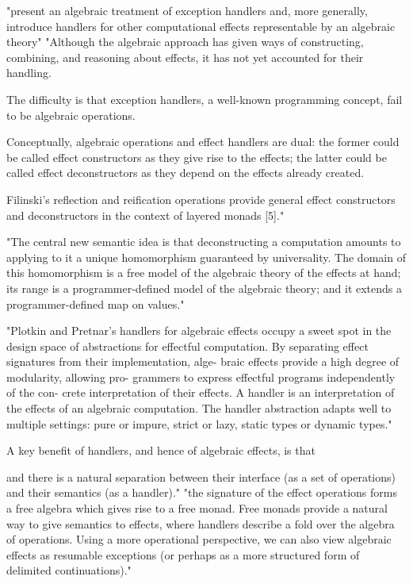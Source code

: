"present an algebraic treatment of exception handlers and,
more generally, introduce handlers for other computational effects
representable by an algebraic theory"
"Although the algebraic approach has given ways of constructing,
combining, and reasoning about effects, it has not yet accounted for their handling.


The difficulty is that exception handlers, a well-known programming concept,
fail to be algebraic operations.

Conceptually, algebraic operations and effect handlers are dual:
the former could be called effect constructors as they give rise to the effects;
the latter could be called effect deconstructors as they depend on the effects already created.

Filinski’s reflection and reification operations provide general effect constructors
and deconstructors in the context of layered monads [5]."

"The central new semantic idea is that deconstructing a computation amounts to
applying to it a unique homomorphism guaranteed by universality.
The domain of this homomorphism is a free model of the algebraic theory of the effects at hand;
its range is a programmer-defined model of the algebraic theory;
and it extends a programmer-defined map on values."
\cite{Plotkin:2009dr}


"Plotkin and Pretnar’s handlers for algebraic effects occupy a sweet spot in the design space of abstractions for effectful computation. By separating effect signatures from their implementation, alge- braic effects provide a high degree of modularity, allowing pro- grammers to express effectful programs independently of the con- crete interpretation of their effects. A handler is an interpretation of the effects of an algebraic computation. The handler abstraction adapts well to multiple settings: pure or impure, strict or lazy, static types or dynamic types."
\cite{kammar2013handlers}

A key benefit of handlers, and hence of algebraic effects,
is that

and there is a natural separation between
their interface (as a set of operations)
and
their semantics (as a handler)."
"the signature of the effect operations forms a free algebra which gives rise to a free monad.
Free monads provide a natural way to give semantics to effects,
where handlers describe a fold over the algebra of operations.
Using a more operational perspective,
we can also view algebraic effects as resumable exceptions
(or perhaps as a more structured form of delimited continuations)."
\cite{leijen2017type}

